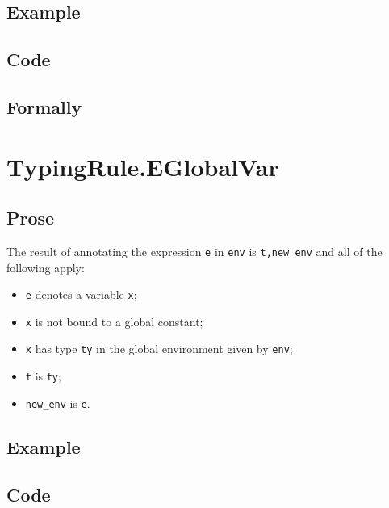 \documentclass{book}
\begin{document}
  \subsection{Example}

  \subsection{Code}

\begin{emptyformal}
  \subsection{Formally}
\end{emptyformal}


\section{TypingRule.EGlobalVar \label{sec:TypingRule.EGlobalVar}}

  \subsection{Prose}
  The result of annotating the expression \texttt{e} in \texttt{env} is
\texttt{t,new\_env} and all of the following apply:
  \begin{itemize}
  \item \texttt{e} denotes a variable \texttt{x};
  \item \texttt{x} is not bound to a global constant;
  \item \texttt{x} has type \texttt{ty} in the global environment given by \texttt{env};
  \item \texttt{t} is \texttt{ty};
  \item \texttt{new\_env} is \texttt{e}.
  \end{itemize}

  \subsection{Example}

  \subsection{Code}
\end{document}

